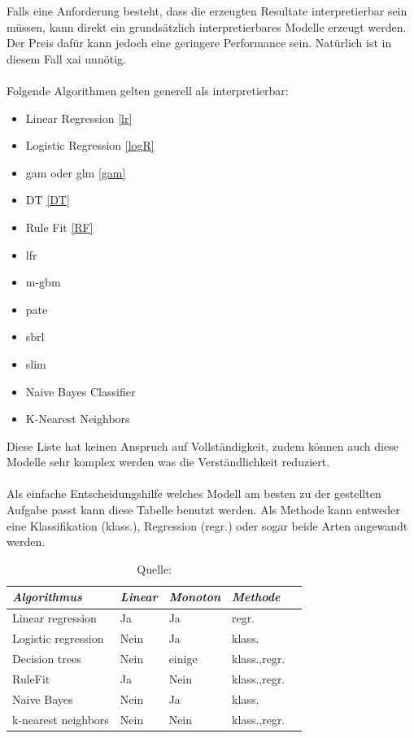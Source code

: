 \documentclass[
  12pt, %
  a4paper, %
  oneside, %
  openany, 
  numbers=noenddot, %
  BCOR=5mm, %
  parskip=half*, %
  thesis, %
]{bfhbook}
\begin{document}
Falls eine Anforderung besteht, dass die erzeugten Resultate interpretierbar sein müssen, kann direkt ein grundsätzlich interpretierbares Modelle erzeugt werden. Der Preis dafür kann jedoch eine geringere Performance sein. Natürlich ist in diesem Fall \Gls{xai} unnötig.
\\
\\
Folgende Algorithmen gelten generell als interpretierbar:
\begin{itemize}
	\item Linear Regression \ref{lr}
	\item Logistic Regression \ref{logR}
	\item \acrfull{gam} oder \acrfull{glm} \ref{gam}
	\item \Gls{DT} \ref{DT}
	\item Rule Fit  \ref{RF}
	\item \acrfull{lfr}
	\item \acrfull{m-gbm}
	\item \acrfull{pate}	
	\item \acrfull{sbrl}
	\item \acrfull{slim}
	\item Naive Bayes Classifier
	\item K-Nearest Neighbors
\end{itemize}
Diese Liste hat keinen Anspruch auf Vollständigkeit, zudem können auch diese Modelle sehr komplex werden was die Verständlichkeit reduziert.
\\\\
Als einfache Entscheidungshilfe welches Modell am besten zu der gestellten Aufgabe passt kann diese Tabelle benutzt werden. Als Methode kann entweder eine Klassifikation (klass.), Regression (regr.) oder sogar beide Arten angewandt werden.  \\
\begin{table}[ht]
\begin{tabular}{@{} *5l @{}}    \toprule
	\emph{Algorithmus} & \emph{Linear} & \emph{Monoton} & \emph{Methode}  \\\midrule
	Linear regression & Ja & Ja & 	regr. \\
	Logistic regression & Nein & Ja & 	klass. \\
	Decision trees & Nein & einige &	klass.,regr. \\
	RuleFit & Ja & Nein & 	klass.,regr. \\
	Naive Bayes	 & Nein & Ja & 	klass. \\
	k-nearest neighbors & Nein & Nein & klass.,regr. \\ \bottomrule
	 \hline
\end{tabular}
\caption*{Quelle: \parencite{iML}}
\end{table}
\end{document}

